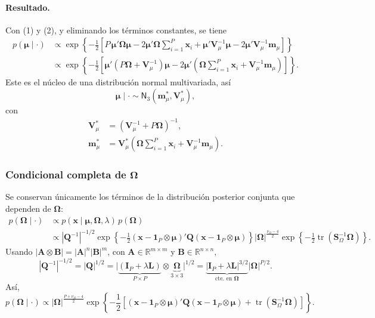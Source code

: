 \documentclass[11pt,a4paper]{article}
\begin{document}
\paragraph{Resultado.}
Con (1) y (2), y eliminando los términos constantes, se tiene
\begin{align*}
p(\boldsymbol{\mu} \mid \cdot)
&\propto \exp\left\{ -\frac{1}{2}\left[ P\,\boldsymbol{\mu}'\mathbf{\Omega}\boldsymbol{\mu} - 2\boldsymbol{\mu}'\mathbf{\Omega}\sum_{i=1}^{P}\boldsymbol{x}_i + \boldsymbol{\mu}'\mathbf{V}_\mu^{-1}\boldsymbol{\mu} - 2\boldsymbol{\mu}'\mathbf{V}_\mu^{-1}\boldsymbol{m}_\mu \right] \right\} \\
&\propto \exp\left\{ -\frac{1}{2}\left[ \boldsymbol{\mu}'\left(P\mathbf{\Omega} + \mathbf{V}_\mu^{-1}\right)\boldsymbol{\mu} - 2\boldsymbol{\mu}'\left(\mathbf{\Omega}\sum_{i=1}^{P}\boldsymbol{x}_i + \mathbf{V}_\mu^{-1}\boldsymbol{m}_\mu\right) \right] \right\}.
\end{align*}
Este es el núcleo de una distribución normal multivariada, así
\[
\boldsymbol{\mu} \mid \cdot \sim \textsf{N}_3\left(\boldsymbol{m}_\mu^{*}, \mathbf{V}_\mu^{*}\right),
\]
con
\begin{align*}
\mathbf{V}_\mu^{*} &= \left(\mathbf{V}_\mu^{-1} + P\mathbf{\Omega}\right)^{-1}, \\
\boldsymbol{m}_\mu^{*} &= \mathbf{V}_\mu^{*}\left(\mathbf{\Omega}\sum_{i=1}^{P}\boldsymbol{x}_i + \mathbf{V}_\mu^{-1}\boldsymbol{m}_\mu\right).
\end{align*}

\subsubsection*{Condicional completa de $\mathbf{\Omega}$}

Se conservan únicamente los términos de la distribución posterior conjunta que dependen de $\mathbf{\Omega}$:
\begin{align*}
p(\mathbf{\Omega} \mid \cdot)
&\propto p(\boldsymbol{x} \mid \boldsymbol{\mu}, \mathbf{\Omega}, \lambda)\, p(\mathbf{\Omega}) \\[6pt]
&\propto |\mathbf{Q}^{-1}|^{-1/2} \exp\left\{ -\frac{1}{2} (\boldsymbol{x} - \boldsymbol{1}_P \otimes \boldsymbol{\mu})' \mathbf{Q} (\boldsymbol{x} - \boldsymbol{1}_P \otimes \boldsymbol{\mu}) \right\}
|\mathbf{\Omega}|^{\frac{\nu_\Omega - 4}{2}} \exp\left\{ -\frac{1}{2} \operatorname{tr}(\mathbf{S}_\Omega^{-1}\mathbf{\Omega}) \right\}.
\end{align*}
Usando $|\mathbf{A}\otimes\mathbf{B}| = |\mathbf{A}|^{n}|\mathbf{B}|^{m}$, con $\mathbf{A}\in\mathbb{R}^{m\times m}$ y $\mathbf{B}\in\mathbb{R}^{n\times n}$,
\[
|\mathbf{Q}^{-1}|^{-1/2} = |\mathbf{Q}|^{1/2} = \big|\underbrace{(\mathbf{I}_P + \lambda\mathbf{L})}_{P\times P} \otimes \underbrace{\mathbf{\Omega}}_{3\times 3}\big|^{1/2} = \underbrace{|\mathbf{I}_P + \lambda\mathbf{L}|^{3/2}}_{\text{cte. en }\mathbf{\Omega}} |\mathbf{\Omega}|^{P/2}.
\]
Así,
\[
p(\mathbf{\Omega} \mid \cdot) \propto |\mathbf{\Omega}|^{\frac{P + \nu_\Omega - 4}{2}} \exp\left\{ -\frac{1}{2}\left[ (\boldsymbol{x} - \boldsymbol{1}_P \otimes \boldsymbol{\mu})' \mathbf{Q} (\boldsymbol{x} - \boldsymbol{1}_P \otimes \boldsymbol{\mu}) + \operatorname{tr}(\mathbf{S}_\Omega^{-1}\mathbf{\Omega}) \right] \right\}.
\]
\end{document}
